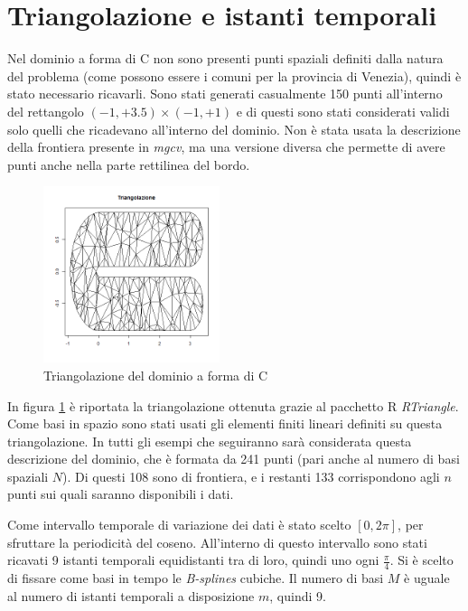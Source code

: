 \documentclass[a4paper,11pt,twoside,openright]{book}							%
\begin{document}
\section{Triangolazione e istanti temporali}
Nel dominio a forma di C non sono presenti punti spaziali definiti dalla natura del problema (come possono essere i comuni per la provincia di Venezia), quindi è stato necessario ricavarli. Sono stati generati casualmente 150 punti all'interno del rettangolo $(-1,+3.5) \times (-1,+1)$ e di questi sono stati considerati validi solo quelli che ricadevano all'interno del dominio. Non è stata usata la descrizione della frontiera presente in \textit{mgcv}, ma una versione diversa che permette di avere punti anche nella parte rettilinea del bordo.
\begin{figure}[t]
	\centering
	\includegraphics[width=0.46\textwidth]{Immagini/DomC_Triangolazione.png}
	\caption{Triangolazione del dominio a forma di C}
	\label{fig:domC_triang}
\end{figure}
In figura \ref{fig:domC_triang} è riportata la triangolazione ottenuta grazie al pacchetto R \textit{RTriangle}. Come basi in spazio sono stati usati gli elementi finiti lineari definiti su questa triangolazione. In tutti gli esempi che seguiranno sarà considerata questa descrizione del dominio, che è formata da 241 punti (pari anche al numero di basi spaziali $N$). Di questi 108 sono di frontiera, e i restanti 133 corrispondono agli $n$ punti sui quali saranno disponibili i dati.

Come intervallo temporale di variazione dei dati è stato scelto $[0,2\pi]$, per sfruttare la periodicità del coseno. All'interno di questo intervallo sono stati ricavati 9 istanti temporali equidistanti tra di loro, quindi uno ogni $\frac{\pi}{4}$. Si è scelto di fissare come basi in tempo le \textit{B-splines} cubiche. Il numero di basi $M$ è uguale al numero di istanti temporali a disposizione $m$, quindi 9. 
\end{document}
